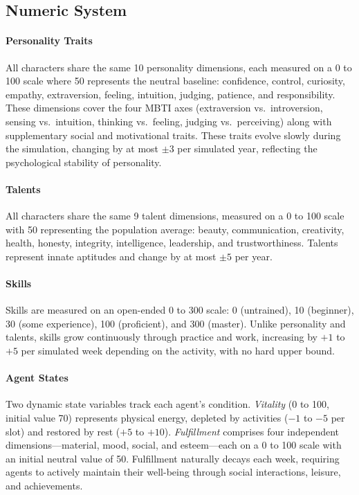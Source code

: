 \subsection{Numeric System}
\label{app:numeric}

\paragraph{Personality Traits}
All characters share the same 10 personality dimensions, each measured on a 0 to 100 scale where 50 represents the neutral baseline:
confidence, control, curiosity, empathy, extraversion, feeling, intuition, judging, patience, and responsibility.
These dimensions cover the four MBTI axes (extraversion vs.\ introversion, sensing vs.\ intuition, thinking vs.\ feeling, judging vs.\ perceiving) along with supplementary social and motivational traits.
These traits evolve slowly during the simulation, changing by at most $\pm 3$ per simulated year, reflecting the psychological stability of personality.

\paragraph{Talents}
All characters share the same 9 talent dimensions, measured on a 0 to 100 scale with 50 representing the population average:
beauty, communication, creativity, health, honesty, integrity, intelligence, leadership, and trustworthiness.
Talents represent innate aptitudes and change by at most $\pm 5$ per year.

\paragraph{Skills}
Skills are measured on an open-ended 0 to 300 scale:
0 (untrained), 10 (beginner), 30 (some experience), 100 (proficient), and 300 (master).
Unlike personality and talents, skills grow continuously through practice and work, increasing by $+1$ to $+5$ per simulated week depending on the activity, with no hard upper bound.

\paragraph{Agent States}
Two dynamic state variables track each agent's condition.
\textit{Vitality} (0 to 100, initial value 70) represents physical energy, depleted by activities ($-1$ to $-5$ per slot) and restored by rest ($+5$ to $+10$).
\textit{Fulfillment} comprises four independent dimensions---material, mood, social, and esteem---each on a 0 to 100 scale with an initial neutral value of 50.
Fulfillment naturally decays each week, requiring agents to actively maintain their well-being through social interactions, leisure, and achievements.


